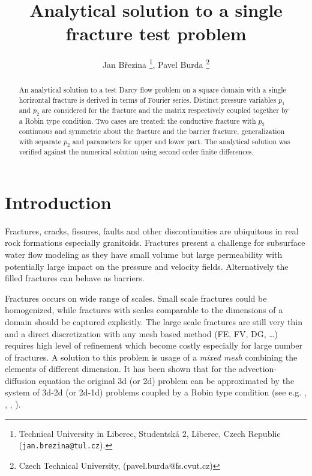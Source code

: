 \documentclass[a4paper,10pt]{article}
\title{Analytical solution to a single fracture test problem
}
\author{%
Jan B\v rezina
\thanks{Technical University in Liberec, Studentsk\'a 2, Liberec, Czech Republic ({\tt jan.brezina@tul.cz}).},
Pavel Burda
\thanks{Czech Technical University, (pavel.burda@fs.cvut.cz)}
}
\begin{document}
\maketitle

\begin{abstract}
An analytical solution to a test Darcy flow problem on a square domain with a single horizontal fracture is
derived in terms of Fourier series. Distinct pressure variables $p_1$ and $p_2$ are considered for 
the fracture and the matrix respectively coupled together by a Robin type condition. 
Two cases are treated: the conductive fracture with $p_2$ continuous and symmetric about the fracture and the barrier fracture,
generalization with separate $p_2$ and parameters for upper and lower part. The analytical solution was verified against
the numerical solution using second order finite differences. 
\end{abstract}





\section{Introduction}
Fractures, cracks, fissures, faults and other discontinuities are ubiquitous in real rock formations especially granitoids.  
Fractures present a challenge for subsurface water flow modeling as they have small volume but large permeability with
potentially large impact on the pressure and velocity fields. Alternatively the filled fractures can behave as barriers. 

Fractures occurs on wide range of scales. Small scale fractures could be homogenized, while fractures with scales 
comparable to the dimensions of a domain should be captured explicitly. The large scale fractures are still very thin and 
a direct discretization with any mesh based method (FE, FV, DG, \dots) requires high level of refinement which become 
costly especially for large number of fractures. A solution to this problem is usage of a {\it mixed mesh} combining 
the elements of different dimension. It has been shown that for the advection-diffusion equation the original 3d (or 2d) 
problem can be approximated by the system of 3d-2d (or 2d-1d) problems coupled by a Robin type condition (see e.g. \cite{Martin2005},
, \cite{fumagalli_numerical_2011}, \cite{brezina_analysis_2015}). 
\end{document}
